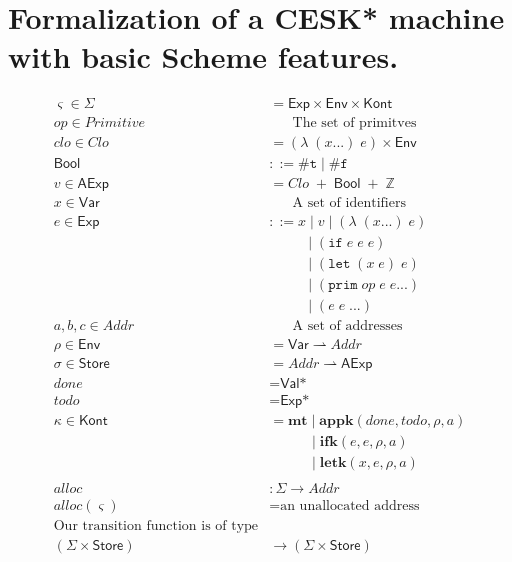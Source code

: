 \documentclass[12pt,draft]{article}
\begin{document}
\newcommand{\lamsyn}[2]{(\lambda\;(#1 ...)\;#2)}
\newcommand{\letsyn}[3]{(\texttt{let}\;(#1\;#2)\;#3)}
\newcommand{\ifsyn}[3]{(\texttt{if}\;#1\;#2\;#3)}
\newcommand{\primsyn}[3]{(\texttt{prim}\;#1\;#2\;#3 ...)}
\newcommand{\truesyn}{\texttt{\#t}}
\newcommand{\falsesyn}{\texttt{\#f}}



\section{Formalization of a CESK* machine with basic Scheme features.}

\begin{align*}
\varsigma \in \Sigma &= \textsf{Exp} \times \textsf{Env} \times \textsf{Kont} \\
op \in \textit{Primitive} &\;\;\;\;\;\; \text{The set of primitves} \\
\mathit{clo} \in \mathit{Clo} &= \lamsyn{x}{e} \times \textsf{Env} \\
\textsf{Bool} &::= \truesyn \;|\; \falsesyn \\
v \in \textsf{AExp} &= \mathit{Clo} \;+\; \textsf{Bool} \;+\; \mathbb{Z} \\
x \in \textsf{Var} &\;\;\;\;\;\; \text{A set of identifiers} \\
e \in \textsf{Exp} &::= x  \;|\; v \;|\; \lamsyn{x}{e} \\
				  &	\;\;\;\;\;\;\;\;\; \;|\; \ifsyn{e}{e}{e}  \\
				  &	\;\;\;\;\;\;\;\;\; \;|\; \letsyn{x}{e}{e} \\
				  &	\;\;\;\;\;\;\;\;\; \;|\; \primsyn{op}{e}{e} \\
				  &	\;\;\;\;\;\;\;\;\; \;|\; (e \; e \; ...) \\
a,b,c \in \textit{Addr} &\;\;\;\;\;\; \text{A set of addresses} \\
\rho \in \textsf{Env} &= \textsf{Var} \rightharpoonup \textit{Addr} \\
\sigma \in \textsf{Store} &= \textit{Addr} \rightharpoonup \textsf{AExp} \\
done &= \textsf{Val*} \\
todo &= \textsf{Exp*} \\
\kappa \in \textsf{Kont} &= \textbf{mt} \;|\; \textbf{appk}(done, todo, \rho, a) \\
					   &	\;\;\;\;\;\;\;\;\;\; \;|\; \textbf{ifk}(e, e, \rho, a) \\
					   &	\;\;\;\;\;\;\;\;\;\; \;|\; \textbf{letk}(x, e, \rho, a) \\
\\
alloc &: \Sigma \rightarrow Addr \\
alloc(\varsigma) &= \text{an unallocated address} \\
\text{Our transition function is of type} \\
(\Sigma \times \textsf{Store}) &\rightarrow (\Sigma \times \textsf{Store})
\end{align*}
\end{document}
